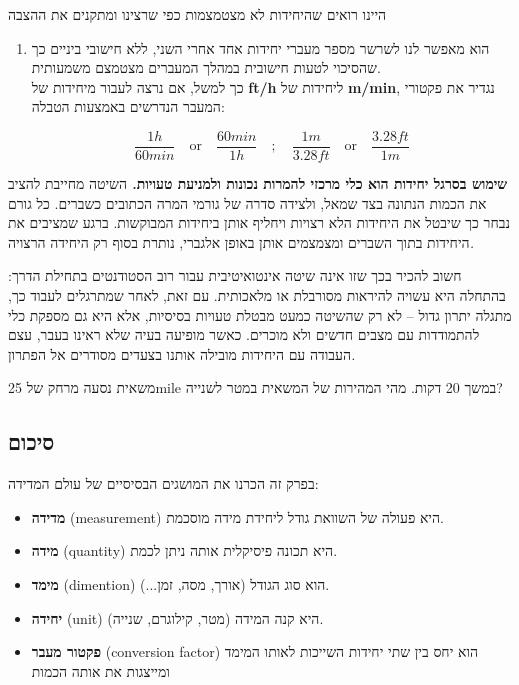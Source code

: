 \documentclass[
  hebrew,
  letterpaper,
  DIV=11,
  numbers=noendperiod]{scrreprt}
\begin{document}
{היינו רואים שהיחידות לא מצטמצמות כפי שרצינו ומתקנים את ההצבה}

\begin{enumerate}
\def\labelenumi{\arabic{enumi}.}
\setcounter{enumi}{1}
\item
  הוא מאפשר לנו לשרשר מספר מעברי יחידות אחד אחרי השני, ללא חישובי ביניים
  כך שהסיכוי לטעות חישובית במהלך המעברים מצטמצם משמעותית.\\
  כך למשל, אם נרצה לעבור מיחידות של \textbf{ft/h} ליחידות של
  \textbf{m/min}, נגדיר את פקטורי המעבר הנדרשים באמצעות הטבלה:

  \[
  \frac{1h}{60min} \quad \text{or} \quad \frac{60min}{1h} \quad ; \quad \frac{1m}{3.28ft} \quad \text{or} \quad \frac{3.28ft}{1m}
  \]
\end{enumerate}

\textbf{{שימוש בסרגל יחידות הוא כלי מרכזי להמרות נכונות ולמניעת
טעויות}\emph{.}} {השיטה מחייבת להציב את הכמות הנתונה בצד שמאל, ולצידה
סדרה של גורמי המרה הכתובים כשברים. כל גורם נבחר כך שיבטל את היחידות הלא
רצויות ויחליף אותן ביחידות המבוקשות. ברגע שמציבים את היחידות בתוך השברים
ומצמצמים אותן באופן אלגברי, נותרת בסוף רק היחידה הרצויה}\emph{.}

{חשוב להכיר בכך שזו אינה שיטה אינטואיטיבית עבור רוב הסטודנטים בתחילת
הדרך: בהתחלה היא עשויה להיראות מסורבלת או מלאכותית. עם זאת, לאחר
שמתרגלים לעבוד כך, מתגלה יתרון גדול -- לא רק שהשיטה כמעט מבטלת טעויות
בסיסיות, אלא היא גם מספקת כלי להתמודדות עם מצבים חדשים ולא מוכרים. כאשר
מופיעה בעיה שלא ראינו בעבר, עצם העבודה עם היחידות מובילה אותנו בצעדים
מסודרים אל הפתרון}\emph{.}

{משאית נסעה מרחק של} 25mile {במשך 20 דקות. מהי המהירות של המשאית במטר
לשנייה?}

\subsection{\texorpdfstring{{סיכום}}{סיכום}}\label{ux5e1ux5d9ux5dbux5d5ux5dd-1}

{בפרק זה הכרנו את המושגים הבסיסיים של עולם המדידה:}

\begin{itemize}
\item
  {\textbf{מדידה} (}measurement{) היא פעולה של השוואת גודל ליחידת מידה
  מוסכמת.}
\item
  {\textbf{מידה} (}quantity{) היא תכונה פיסיקלית אותה ניתן לכמת.}
\item
  {\textbf{מימד} (}dimention{) הוא סוג הגודל (אורך, מסה, זמן...).}
\item
  {\textbf{יחידה} (}unit{) היא קנה המידה (מטר, קילוגרם, שנייה).}
\item
  {\textbf{פקטור מעבר} (}conversion factor{) הוא יחס בין שתי יחידות
  השייכות לאותו המימד ומייצגות את אותה הכמות}
\end{itemize}
\end{document}
